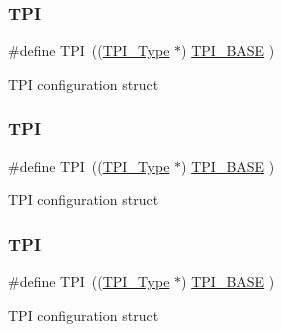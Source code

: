 \subsubsection{\texorpdfstring{T\+PI}{TPI}\hspace{0.1cm}{\footnotesize\ttfamily [2/4]}}
{\footnotesize\ttfamily \#define T\+PI~((\hyperlink{struct_t_p_i___type}{T\+P\+I\+\_\+\+Type}       $\ast$)     \hyperlink{group___c_m_s_i_s__core__base_ga2b1eeff850a7e418844ca847145a1a68}{T\+P\+I\+\_\+\+B\+A\+SE}      )}

T\+PI configuration struct \mbox{\label{group___c_m_s_i_s__core__base_ga8b4dd00016aed25a0ea54e9a9acd1239}} 
\subsubsection{\texorpdfstring{T\+PI}{TPI}\hspace{0.1cm}{\footnotesize\ttfamily [3/4]}}
{\footnotesize\ttfamily \#define T\+PI~((\hyperlink{struct_t_p_i___type}{T\+P\+I\+\_\+\+Type}       $\ast$)     \hyperlink{group___c_m_s_i_s__core__base_ga2b1eeff850a7e418844ca847145a1a68}{T\+P\+I\+\_\+\+B\+A\+SE}      )}

T\+PI configuration struct \mbox{\label{group___c_m_s_i_s__core__base_ga8b4dd00016aed25a0ea54e9a9acd1239}} 
\subsubsection{\texorpdfstring{T\+PI}{TPI}\hspace{0.1cm}{\footnotesize\ttfamily [4/4]}}
{\footnotesize\ttfamily \#define T\+PI~((\hyperlink{struct_t_p_i___type}{T\+P\+I\+\_\+\+Type}       $\ast$)     \hyperlink{group___c_m_s_i_s__core__base_ga2b1eeff850a7e418844ca847145a1a68}{T\+P\+I\+\_\+\+B\+A\+SE}      )}

T\+PI configuration struct \mbox{\label{group___c_m_s_i_s__core__base_ga2b1eeff850a7e418844ca847145a1a68}} 
